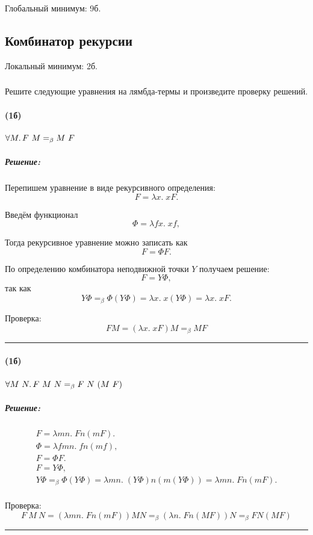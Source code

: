 \documentclass{article}
\newenvironment{proof}{\subparagraph{\hspace{-1em}Решение:\newline}}{\par\noindent\rule{\textwidth}{0.4pt}}
\newcommand{\eqbeta}{=_\beta}
\begin{document}
    Глобальный минимум: 9б.

    \subsection{Комбинатор рекурсии}

    Локальный минимум: 2б.

    \subsubsection{}

    Решите следующие уравнения на лямбда-термы и произведите проверку решений.

    \paragraph{(1б)}

    $\forall M\ldotp F~M \eqbeta M~F$

    \begin{proof}
        Перепишем уравнение в виде рекурсивного определения:
        \[
            F = \lambda x.\; x F.
        \]

        Введём функционал
        \[
            \Phi = \lambda f x.\; x f,
        \]

        Тогда рекурсивное уравнение можно записать как
        \[
            F = \Phi F.
        \]

        По определению комбинатора неподвижной точки $Y$ получаем решение:
        \[
            F = Y \Phi,
        \]
        так как
        \[
            Y \Phi \eqbeta \Phi (Y \Phi) = \lambda x.\; x (Y \Phi) = \lambda x.\; x F.
        \]

        Проверка:
        \[
            F M = (\lambda x.\; x F) M \eqbeta M F
        \]
    \end{proof}

    \paragraph{(1б)}

    $\forall M~N\ldotp F~M~N \eqbeta F~N~(M~F)$

    \begin{proof}
        \begin{gather*}
            F = \lambda m n.\; F n (m F).\\
            \Phi = \lambda f m n.\; f n (m f),\\
            F = \Phi F.\\
            F = Y \Phi,\\
            Y \Phi \eqbeta \Phi (Y \Phi) = \lambda m n.\; (Y \Phi) n (m (Y \Phi)) = \lambda m n.\; F n (m F).\\
        \end{gather*}

        Проверка:
        \[
            F~M~N = (\lambda m n.\; F n (m F)) M N \eqbeta (\lambda n.\; F n (M F)) N \eqbeta F N (M F)
        \]
    \end{proof}
\end{document}
